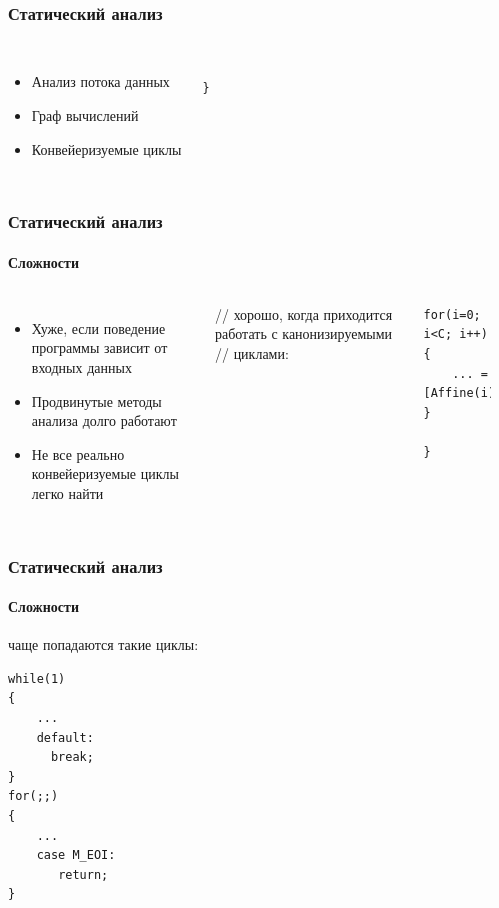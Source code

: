 \documentclass{beamer}              %
\begin{document}
\begin{frame}[fragile]
\frametitle{Статический анализ}
  \framesubtitle{}
  \begin{columns}
        \begin{itemize}
            \item Анализ потока данных
            \item Граф вычислений
            \item Конвейеризуемые циклы
        \end{itemize}      

 
      
\begin{lstlisting}[frame=single]

}
\end{lstlisting}
\label{encode_listing}
      
  \end{columns}
  
\end{frame}

\begin{frame}[fragile]
\frametitle{Статический анализ}
  \framesubtitle{Сложности}
  \begin{columns}
        \begin{itemize}
            \item Хуже, если поведение программы зависит от входных данных
            \item Продвинутые методы анализа долго работают
            \item Не все реально конвейеризуемые циклы легко найти
        \end{itemize}      


// хорошо, когда приходится работать с канонизируемыми
// циклами: 
\begin{lstlisting}[frame=single]
for(i=0; i<C; i++)
{
    ... = [Affine(i)];
}

}
\end{lstlisting}
\label{encode_listing}
      
  \end{columns}
  
\end{frame}

\begin{frame}[fragile]
\frametitle{Статический анализ}
  \framesubtitle{Сложности}
  
чаще попадаются такие циклы: 
\begin{lstlisting}[frame=single]
while(1)
{
    ...
    default:
      break;
}
for(;;)
{
    ...
    case M_EOI:
       return;
}

\end{lstlisting}
\label{encode_listing}

\end{frame}
\end{document}
